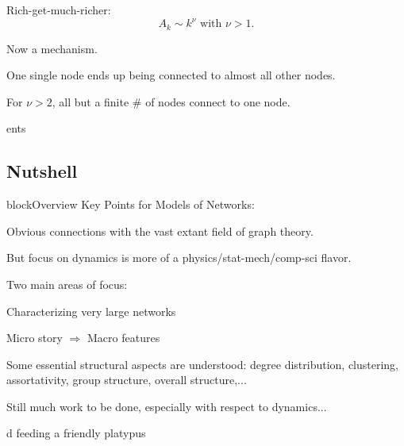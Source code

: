   
  
  
    Rich-get-much-richer:
    $$
    A_k \sim k^\nu
    \mbox{\ with $\nu > 1$.}
    $$
  
    Now a  mechanism.
  
    One single node ends up being connected to
    almost all other nodes.
  
    For $\nu>2$, all but a finite \# of nodes connect
    to one node.
  
  
  
ents





\subsection{Nutshell}


{block}{Overview Key Points for Models of Networks:}
    
    
      Obvious connections with the vast
      extant field of graph theory.
    
      But focus on dynamics is more of a physics/stat-mech/comp-sci
      flavor.
    
      Two main areas of focus:
      
       
         Characterizing very large networks
      
         Micro story $\Rightarrow$ Macro features
      
    
      Some essential structural aspects are understood: degree distribution, clustering,
      assortativity, group structure, overall structure,...
    
      Still much work to be done, especially with respect to dynamics...
      {}
    
    
  

d feeding a friendly platypus
